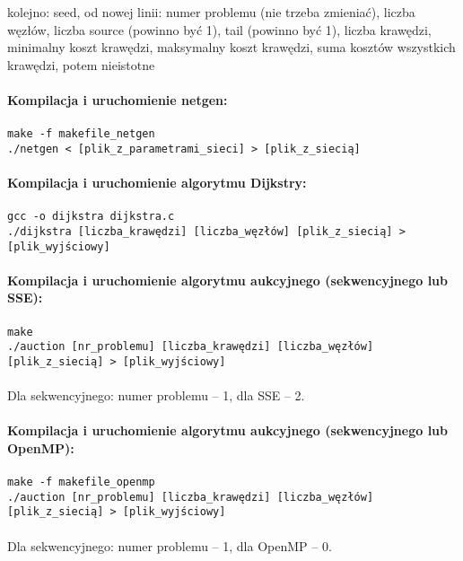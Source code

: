 \documentclass[12pt,a4paper]{article}
\begin{document}
kolejno: seed, od nowej linii: numer problemu (nie trzeba zmieniać), liczba węzłów, liczba source (powinno być 1), tail (powinno być 1), liczba krawędzi, minimalny koszt krawędzi, maksymalny koszt krawędzi, suma kosztów wszystkich krawędzi, potem nieistotne\\\\
\textbf{Kompilacja i uruchomienie netgen:}\\\\
\texttt{make -f makefile\_netgen\\
./netgen < [plik\_z\_parametrami\_sieci] > [plik\_z\_siecią]}\\\\
\textbf{Kompilacja i uruchomienie algorytmu Dijkstry:}\\\\
\texttt{gcc -o dijkstra dijkstra.c\\
./dijkstra [liczba\_krawędzi] [liczba\_węzłów] [plik\_z\_siecią] > [plik\_wyjściowy]}\\\\
\textbf{Kompilacja i uruchomienie algorytmu aukcyjnego (sekwencyjnego lub SSE):}\\\\
\texttt{make\\
./auction [nr\_problemu] [liczba\_krawędzi] [liczba\_węzłów] [plik\_z\_siecią] > [plik\_wyjściowy]\\\\}
Dla sekwencyjnego: numer problemu -- 1, dla SSE -- 2.\\\\
\textbf{Kompilacja i uruchomienie algorytmu aukcyjnego (sekwencyjnego lub OpenMP):}\\\\
\texttt{make -f makefile\_openmp\\
./auction [nr\_problemu] [liczba\_krawędzi] [liczba\_węzłów] [plik\_z\_siecią] > [plik\_wyjściowy]\\\\}
Dla sekwencyjnego: numer problemu -- 1, dla OpenMP -- 0.
\end{document}
